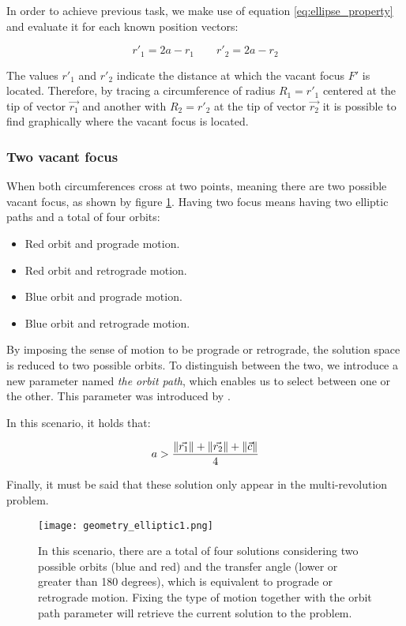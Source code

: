In order to achieve previous task, we make use of equation
\ref{eq:ellipse_property} and evaluate it for each known position vectors:

\begin{equation}
  r'_{1} = 2a - r_{1}\quad\quad
  r'_{2} = 2a - r_{2}
\end{equation}

The values $r'_{1}$ and $r'_{2}$ indicate the distance at which the vacant focus
$F'$ is located. Therefore, by tracing a circumference of radius $R_{1} = r'_{1}$
centered at the tip of vector $\vec{r_{1}}$ and another with $R_{2} = r'_{2}$ at
the tip of vector $\vec{r_{2}}$ it is possible to find graphically where the
vacant focus is located.

\subsubsection{Two vacant focus}
When both circumferences cross at two points, meaning there are two possible
vacant focus, as shown by figure \ref{fig:elliptic_geometry_1}. Having two focus
means having two elliptic paths and a total of four orbits:

\begin{itemize}
  \item Red orbit and prograde motion.
  \item Red orbit and retrograde motion.
  \item Blue orbit and prograde motion.
  \item Blue orbit and retrograde motion.
\end{itemize}

By imposing the sense of motion to be prograde or retrograde, the solution space
is reduced to two possible orbits. To distinguish between the two, we introduce
a new parameter named \textit{the orbit path}, which enables us to select
between one or the other. This parameter was introduced by \cite{sun1977}.

In this scenario, it holds that:

\begin{equation}
  a > \frac{\lVert\vec{r_{1}}\rVert + \lVert\vec{r_{2}}\rVert + \lVert\vec{c}\rVert}{4}
\end{equation}

Finally, it must be said that these solution only appear in the
multi-revolution problem.

\begin{figure}[H]
  \centering
  \texttt{[image: geometry\_elliptic1.png]}
  \caption[Elliptic transfer geometry for two vacant focus]{
    In this scenario, there are a total of four solutions considering two
    possible orbits (blue and red) and the transfer angle (lower or greater than
    180 degrees), which is equivalent to prograde or retrograde motion. Fixing
    the type of motion together with the orbit path parameter will retrieve the
    current solution to the problem.
  }
  \label{fig:elliptic_geometry_1}
\end{figure}

